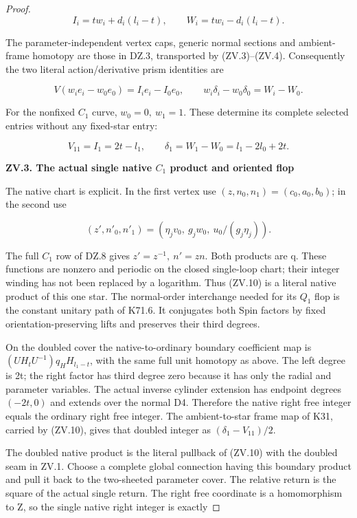 \begin{proof}
\[
 I_i=t w_i+d_i(l_i-t),\qquad
 W_i=t w_i-d_i(l_i-t).                              \tag{ZV.7}
\]

The parameter-independent vertex caps, generic normal sections and
ambient-frame homotopy are those in DZ.3, transported by (ZV.3)--(ZV.4).
Consequently the two literal action/derivative prism identities are

\[
 V(w_i e_i-w_0e_0)=I_i e_i-I_0e_0,\qquad
 w_i\delta_i-w_0\delta_0=W_i-W_0.                  \tag{ZV.8}
\]

For the nonfixed \(C_1\) curve, \(w_0=0,\ w_1=1\). These determine its complete
selected entries without any fixed-star entry:

\[
 V_{11}=I_1=2t-l_1,\qquad
 \delta_1=W_1-W_0=l_1-2l_0+2t.                     \tag{ZV.9}
\]

\par

\medskip\noindent\textbf{ZV.3. The actual single native \(C_1\) product and oriented flop}

\par\nopagebreak[4]

The native chart is explicit. In the first vertex use
\((z,n_0,n_1)=(c_0,a_0,b_0)\); in the second use

\[
 (z',n'_0,n'_1)=(\eta_jv_0,\ g_jw_0,\ u_0/(g_j\eta_j)).
                                                        \tag{ZV.10}
\]

The full \(C_1\) row of DZ.8 gives \(z'=z^{-1},\ n'=zn\). Both products
are q. These functions are nonzero and periodic on the closed
single-loop chart; their integer winding has not been replaced by a
logarithm. Thus (ZV.10) is a literal native product of this one star.
The normal-order interchange needed for its \(Q_1\) flop is the constant
unitary path of K71.6. It conjugates both Spin factors by fixed
orientation-preserving lifts and preserves their third degrees.

On the doubled cover the native-to-ordinary boundary coefficient map
is \((UH_tU^{-1})q_HH_{l_1-t}\), with the same full unit homotopy as above.
The left degree is 2t; the right factor has third degree zero because
it has only the radial and parameter variables. The actual inverse
cylinder extension has endpoint degrees \((-2t,0)\) and extends over the
normal D4. Therefore the native right free integer equals the ordinary
right free integer. The ambient-to-star frame map of K31, carried by
(ZV.10), gives that doubled integer as \((\delta_1-V_{11})/2\).

The doubled native product is the literal pullback of (ZV.10) with
the doubled seam in ZV.1. Choose a complete global connection having
this boundary product and pull it back to the two-sheeted parameter
cover. The relative return is the square of the actual single return.
The right free coordinate is a homomorphism to Z, so the single
native right integer is exactly


\end{proof}
